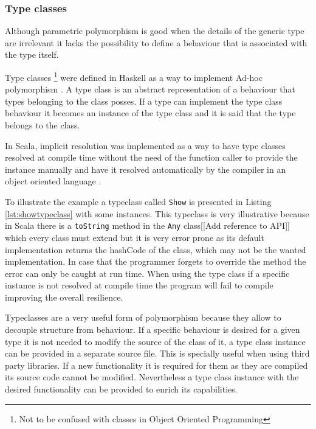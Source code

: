 \documentclass[../main.tex]{subfiles}
\begin{document}


\subsubsection{Type classes} Although parametric polymorphism is good when the
details of the generic type are irrelevant it lacks the possibility to define a
behaviour that is associated with the type itself.

Type classes \footnote{Not to be confused with classes in Object Oriented Programming} were
defined in Haskell as a way to implement Ad-hoc polymorphism
\autocite{Hall1994TypeHaskell}. A type class is an abstract representation of a
behaviour that types belonging to the class posses. If a type can implement
the type class behaviour it becomes an instance of the type class and it is said
that the type belongs to the class.

In Scala, implicit resolution was implemented as a way to have type classes
resolved at compile time without the need of the function caller to provide the
instance manually and have it resolved automatically by the compiler in an
object oriented language \autocite{Oliveira2010TypeImplicits}.

To illustrate the example a typeclass called \texttt{Show} is presented in
Listing \ref{lst:showtypeclass} with some instances. This typeclass is very
illustrative because in Scala there is a \texttt{toString} method in the
\texttt{Any} class[[Add reference to API]] which every class must extend but it
is very error prone as its default implementation returns the hashCode of the
class, which may not be the wanted implementation. In case that the programmer
forgets to override the method the error can only be caught at run time. When
using the type class if a specific instance is not resolved at compile time the
program will fail to compile improving the overall resilience.



Typeclasses are a very useful form of polymorphism because they allow to decouple structure from
behaviour. If a specific behaviour is desired for a given type it is not needed
to modify the source of the class of it, a type class instance can be provided
in a separate source file. This is specially useful when using third party
libraries. If a new functionality it is required for them as they
are compiled its source code cannot be modified. Nevertheless a type class instance
with the desired functionality can be provided to enrich its capabilities.
\end{document}
